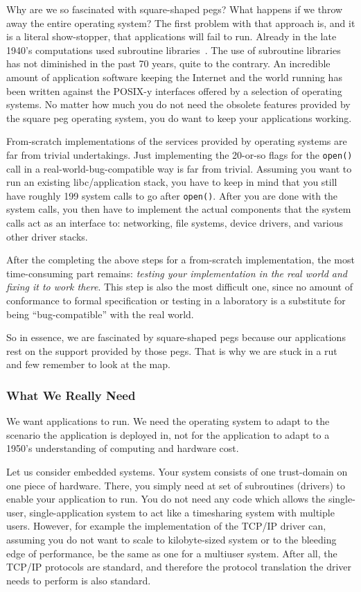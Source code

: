 Why are we so fascinated with square-shaped pegs?  What happens if we
throw away the entire operating system?  The first problem with that
approach is, and it is a literal show-stopper, that applications will
fail to run.  Already in the late 1940's computations used subroutine
libraries~\cite{campbell-kelly:edsac}.  The use of subroutine libraries
has not diminished in the past 70 years, quite to the contrary.
An incredible amount of application software keeping the Internet and the
world running has been written against the POSIX-y interfaces offered
by a selection of operating systems.  No matter how much you do not
need the obsolete features provided by the square peg operating system,
you do want to keep your applications working.

From-scratch implementations of the services provided by operating systems
are far from trivial undertakings.  Just implementing the 20-or-so flags
for the \texttt{open()} call in a real-world-bug-compatible way is far
from trivial.  Assuming you want to run an existing libc/application
stack, you have to keep in mind that you still have roughly 199 system
calls to go after \texttt{open()}.  After you are done with the system
calls, you then have to implement the actual components that the system
calls act as an interface to: networking, file systems, device drivers,
and various other driver stacks.

After the completing the above steps for a from-scratch implementation,
the most time-consuming part remains: \textit{testing your implementation
in the real world and fixing it to work there}.  This step is also the
most difficult one, since no amount of conformance to formal specification
or testing in a laboratory is a substitute for being ``bug-compatible''
with the real world.

So in essence, we are fascinated by square-shaped pegs because our
applications rest on the support provided by those pegs.  That is why
we are stuck in a rut and few remember to look at the map.


\subsubsection{What We Really Need}

We want applications to run.  We need the operating system to
adapt to the scenario the application is deployed in, not for the
application to adapt to a 1950's understanding of computing and hardware
cost.

Let us consider embedded systems.  Your system consists of one trust-domain on one piece
of hardware.  There, you simply need at set of subroutines (drivers) to
enable your application to run.  You do not need any code which allows
the single-user, single-application system to act like a timesharing
system with multiple users.  However, for example the implementation
of the TCP/IP driver can, assuming you do not want to scale to
kilobyte-sized system or to the bleeding edge of performance, be the
same as one for a multiuser system.  After all, the TCP/IP protocols
are standard, and therefore the protocol translation the driver needs
to perform is also standard.

